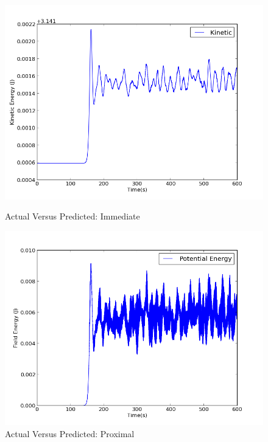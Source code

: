 \documentclass[12pt]{article}
\begin{document}
\begin{figure}    
\begin{minipage}[t]{0.45\textwidth}
\includegraphics[width=\linewidth]{KineticEnergy.png}
\caption{Actual Versus Predicted: Immediate}
\label{fig:immediate}
\end{minipage}
\hspace{\fill}
\begin{minipage}[t]{0.45\textwidth}
\includegraphics[width=\linewidth]{FieldEnergy.png}
\caption{Actual Versus Predicted: Proximal}
\label{fig:proximal}
\end{minipage}


\end{figure}
\end{document}
